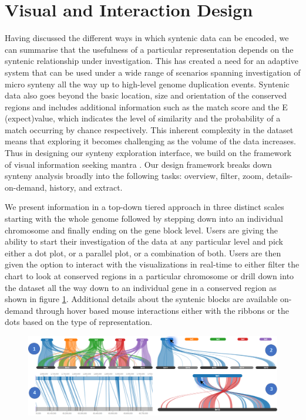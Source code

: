\section{Visual and Interaction Design}

Having discussed the different ways in which syntenic data can be encoded, we can summarise that the usefulness of a particular representation depends on the syntenic relationship under investigation. This has created a need for an adaptive system that can be used under a wide range of scenarios spanning investigation of micro synteny all the way up to high-level genome duplication events. Syntenic data also goes beyond the basic location, size and orientation of the conserved regions and includes additional information such as the match score and the E (expect)value, which indicates the level of similarity and the probability of a match occurring by chance respectively. This inherent complexity in the dataset means that exploring it becomes challenging as the volume of the data increases. Thus in designing our synteny exploration interface, we build on the framework of visual information seeking mantra \cite{Shneiderman96theeyes}. Our design framework breaks down synteny analysis broadly into the following tasks: overview, filter, zoom, details-on-demand, history, and extract.

We present information in a top-down tiered approach in three distinct scales starting with the whole genome followed by stepping down into an individual chromosome and finally ending on the gene block level. Users are giving the ability to start their investigation of the data at any particular level and pick either a dot plot, or a parallel plot, or a combination of both. Users are then given the option to interact with the visualizations in real-time to either filter the chart to look at conserved regions in a particular chromosome or drill down into the dataset all the way down to an individual gene in a conserved region as shown in figure \ref{fig:ch_4_exploration_through_interaction}. Additional details about the syntenic blocks are available on-demand through hover based mouse interactions either with the ribbons or the dots based on the type of representation.

\begin{figure}[h]
  \centering
  \includegraphics[width=1\linewidth]{images/ch_4_exploration_through_interaction.PNG}
  \label{fig:ch_4_exploration_through_interaction}
\end{figure}


